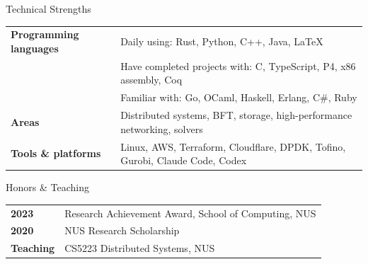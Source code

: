 \documentclass[
]{resume} %
\begin{document}
\begin{rSection}{Technical Strengths}
\begin{tabular}{ @{} >{\bfseries}l p{} }
Programming languages
    & Daily using: Rust, Python, C++, Java, \LaTeX \\
    & Have completed projects with: C, TypeScript, P4, x86 assembly, Coq \\
    & Familiar with: Go, OCaml, Haskell, Erlang, C\#, Ruby \\
Areas
    & Distributed systems, BFT, storage, high-performance networking, solvers \\
Tools \& platforms
    & Linux, AWS, Terraform, Cloudflare, DPDK, Tofino, Gurobi, Claude Code, Codex
\end{tabular}
\end{rSection}

\begin{rSection}{Honors \& Teaching}
\begin{tabular}{ @{} >{\bfseries}ll }
2023 & Research Achievement Award, School of Computing, NUS \\
2020 & NUS Research Scholarship \\
Teaching & CS5223 Distributed Systems, NUS \\
\end{tabular}
\end{rSection}
\end{document}
